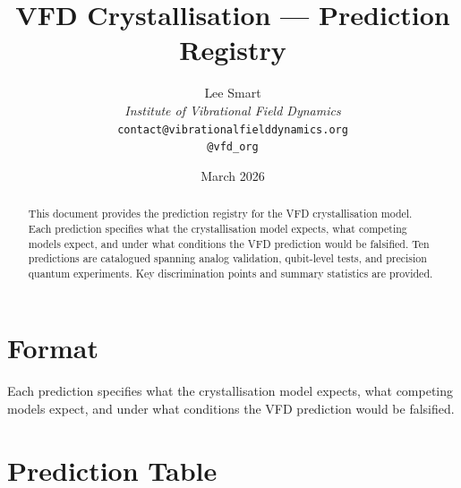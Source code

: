 \documentclass[12pt]{article}
\title{VFD Crystallisation --- Prediction Registry}
\author{%
  Lee Smart\\[4pt]
  \textit{Institute of Vibrational Field Dynamics}\\[2pt]
  \texttt{contact@vibrationalfielddynamics.org}\\[2pt]
  \texttt{@vfd\_org}%
}
\date{March 2026}
\begin{document}
\maketitle

\begin{abstract}
This document provides the prediction registry for the VFD crystallisation model. Each prediction specifies what the crystallisation model expects, what competing models expect, and under what conditions the VFD prediction would be falsified. Ten predictions are catalogued spanning analog validation, qubit-level tests, and precision quantum experiments. Key discrimination points and summary statistics are provided.
\end{abstract}

\section{Format}

Each prediction specifies what the crystallisation model expects, what competing models expect, and under what conditions the VFD prediction would be falsified.

\section{Prediction Table}
\end{document}
